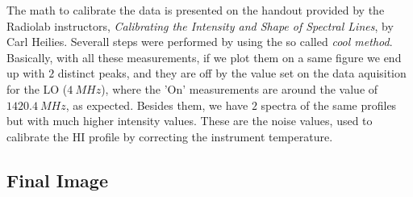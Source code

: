 \documentclass{article}
\begin{document}
The math to calibrate the data is presented on the handout provided by the Radiolab instructors,
\emph{Calibrating the Intensity and Shape of Spectral Lines}, by Carl Heilies.
Severall steps were performed by using the so called \emph{cool method}. Basically, with all these
measurements, if we plot them on a same figure
we end up with $2$ distinct peaks, and they are off by the value set on the data aquisition 
for the LO ($4 \ MHz$), where the 'On' measurements are around the value of $1420.4 \ MHz$, as expected.
Besides them, we have $2$ spectra of the same profiles but with much higher intensity values. These are 
the noise values, used to calibrate the HI profile by correcting the instrument temperature.





\subsection{Final Image} 



\end{document}

